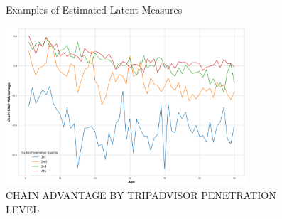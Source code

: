 \documentclass[12pt, leqno]{article}
\begin{document}
\begin{figure}[hp]
 \centering
  
\caption{Examples of Estimated Latent Measures}

\end{figure}
\clearpage

\begin{figure}[hp]
\caption{CHAIN ADVANTAGE BY TRIPADVISOR PENETRATION LEVEL}
 \label{fig:modelfree}
 \centering
 \includegraphics[width=0.8\textwidth,height=\textheight,keepaspectratio]{./Figures/model_free.png}
\end{figure}
\clearpage
\end{document}
